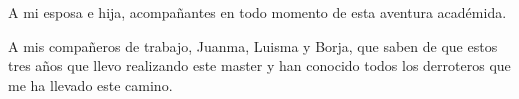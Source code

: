 A mi esposa e hija, acompañantes en todo momento de esta aventura académida.

A mis compañeros de trabajo, Juanma, Luisma y Borja, que saben de que estos tres años que llevo realizando este master y han conocido todos los derroteros que me ha llevado este camino.